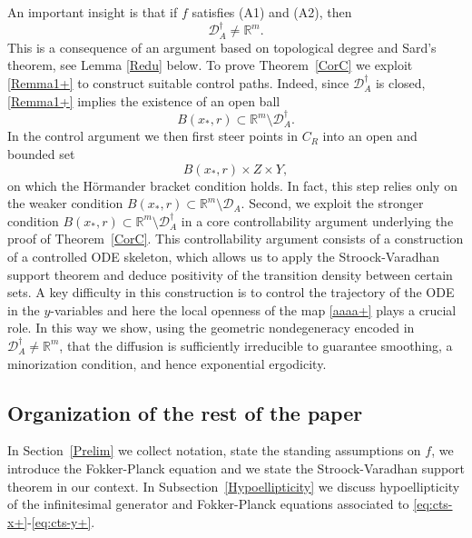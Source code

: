 \documentclass[11pt, a4paper,leqno]{amsart}
\theoremstyle{definition}
\numberwithin{equation}{section}
\newcommand{\R}{\mathbb R}
\begin{document}
An important insight is that if $f$ satisfies \textnormal{(A1)} and \textnormal{(A2)}, then
\begin{equation}\label{Remma1+}
\mathcal D_A^\dagger \neq \mathbb R^m.
\end{equation}
This is a consequence of an argument based on topological degree and Sard’s theorem, see Lemma \ref{Redu}  below. To prove Theorem~\ref{CorC} we exploit \eqref{Remma1+}  to construct suitable control paths. Indeed,  since \(\mathcal D_A^\dagger\) is closed, \eqref{Remma1+} implies the
existence of an open ball
\[
B(x_\ast,r)\subset \mathbb R^m\setminus\mathcal D_A^\dagger .
\]
In the control argument we then first steer points in \(C_R\) into an open and bounded set
\[
B(x_\ast,r)\times Z\times Y,
\]
on which the Hörmander bracket condition holds.
In fact, this step relies only on the weaker condition
\(B(x_\ast,r)\subset\mathbb R^m\setminus\mathcal D_A\). Second, we exploit the stronger condition
\(B(x_\ast,r)\subset\mathbb R^m\setminus\mathcal D_A^\dagger\)
in a core controllability argument underlying the proof of
Theorem~\ref{CorC}.
This controllability argument consists of a construction of a controlled
ODE skeleton, which allows us to apply the Stroock-Varadhan support
theorem and deduce positivity of the transition density between certain
sets.
A key difficulty in this construction is to control the trajectory of the
ODE in the \(y\)-variables and here the local openness of the map
\eqref{aaaa+} plays a crucial role. In this way we show, using the  geometric nondegeneracy
encoded in \(\mathcal D_A^\dagger\neq \R^m\), that the diffusion is sufficiently
irreducible to guarantee smoothing, a minorization condition, and hence
exponential ergodicity.






















\subsection{Organization of the rest of the paper} In Section~\ref{Prelim} we collect notation, state the standing assumptions on \(f\), we introduce the Fokker-Planck equation and we state the Stroock-Varadhan support theorem in our context. In Subsection~\ref{Hypoellipticity} we discuss hypoellipticity of the infinitesimal generator and Fokker-Planck equations associated to \eqref{eq:cts-x+}-\eqref{eq:cts-y+}.
\end{document}
